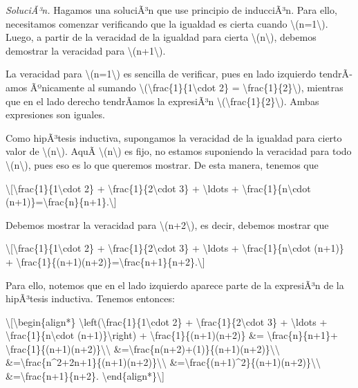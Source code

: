 \emph{SoluciÃ³n.} Hagamos una soluciÃ³n que use principio de inducciÃ³n.
Para ello, necesitamos comenzar verificando que la igualdad es cierta
cuando {\textbackslash(n=1\textbackslash)}. Luego, a partir de la
veracidad de la igualdad para cierta {\textbackslash(n\textbackslash)},
debemos demostrar la veracidad para {\textbackslash(n+1\textbackslash)}.

La veracidad para {\textbackslash(n=1\textbackslash)} es sencilla de
verificar, pues en lado izquierdo tendrÃ­amos Ãºnicamente al sumando
{\textbackslash(\textbackslash frac\{1\}\{1\textbackslash cdot 2\} =
\textbackslash frac\{1\}\{2\}\textbackslash)}, mientras que en el lado
derecho tendrÃ­amos la expresiÃ³n
{\textbackslash(\textbackslash frac\{1\}\{2\}\textbackslash)}. Ambas
expresiones son iguales.

Como hipÃ³tesis inductiva, supongamos la veracidad de la igualdad para
cierto valor de {\textbackslash(n\textbackslash)}. AquÃ­
{\textbackslash(n\textbackslash)} es fijo, no estamos suponiendo la
veracidad para todo {\textbackslash(n\textbackslash)}, pues eso es lo
que queremos mostrar. De esta manera, tenemos que

\textbackslash{[}\textbackslash frac\{1\}\{1\textbackslash cdot 2\} +
\textbackslash frac\{1\}\{2\textbackslash cdot 3\} +
\textbackslash ldots + \textbackslash frac\{1\}\{n\textbackslash cdot
(n+1)\}=\textbackslash frac\{n\}\{n+1\}.\textbackslash{]}

Debemos mostrar la veracidad para {\textbackslash(n+2\textbackslash)},
es decir, debemos mostrar que

\textbackslash{[}\textbackslash frac\{1\}\{1\textbackslash cdot 2\} +
\textbackslash frac\{1\}\{2\textbackslash cdot 3\} +
\textbackslash ldots + \textbackslash frac\{1\}\{n\textbackslash cdot
(n+1)\} +
\textbackslash frac\{1\}\{(n+1)(n+2)\}=\textbackslash frac\{n+1\}\{n+2\}.\textbackslash{]}

Para ello, notemos que en el lado izquierdo aparece parte de la
expresiÃ³n de la hipÃ³tesis inductiva. Tenemos entonces:

\textbackslash{[}\textbackslash begin\{align*\}
\textbackslash left(\textbackslash frac\{1\}\{1\textbackslash cdot 2\} +
\textbackslash frac\{1\}\{2\textbackslash cdot 3\} +
\textbackslash ldots + \textbackslash frac\{1\}\{n\textbackslash cdot
(n+1)\}\textbackslash right) + \textbackslash frac\{1\}\{(n+1)(n+2)\}
\&= \textbackslash frac\{n\}\{n+1\}+
\textbackslash frac\{1\}\{(n+1)(n+2)\}\textbackslash\textbackslash{}
\&=\textbackslash frac\{n(n+2)+(1)\}\{(n+1)(n+2)\}\textbackslash\textbackslash{}
\&=\textbackslash frac\{n\^{}2+2n+1\}\{(n+1)(n+2)\}\textbackslash\textbackslash{}
\&=\textbackslash frac\{(n+1)\^{}2\}\{(n+1)(n+2)\}\textbackslash\textbackslash{}
\&=\textbackslash frac\{n+1\}\{n+2\}.
\textbackslash end\{align*\}\textbackslash{]}

